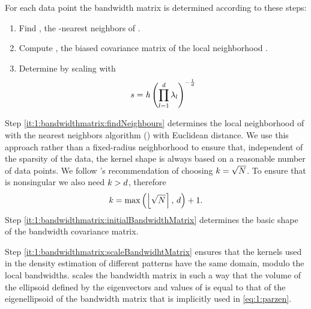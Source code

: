	For each data point \varPattern the bandwidth matrix is determined according to these steps:
		\begin{enumerate}[labelindent=0ex]
			\item \label{it:1:bandwidthmatrix:findNeighbours}
				Find \varNeighborhood{\varPattern}, the \KNNK-nearest neighbors of \varPattern.
			\item \label{it:1:bandwidthmatrix:initialBandwidthMatrix}
				Compute \varCovarianceMatrix, the biased covariance matrix of the local neighborhood \varNeighborhood{\varPattern}.
			\item \label{it:1:bandwidthmatrix:scaleBandwidhtMatrix}
				Determine \varBandwidthMatrix by scaling \varCovarianceMatrix with
				\begin{equation}\label{eq:method:scalingFactor}
					s = \mathit{h} \left( \displaystyle\prod_{l = 1}^{d} \lambda_{l} \right)^{-\frac{1}{d}}
				\end{equation}
		\end{enumerate}	
			Step \ref{it:1:bandwidthmatrix:findNeighbours} determines the local neighborhood of \varPattern with the \KNNK nearest neighbors algorithm (\KNN) with Euclidean distance. We use this approach rather than a fixed-radius neighborhood to ensure that, independent of the sparsity of the data, the kernel shape is always based on a reasonable number of data points. 
			We follow \citeauthor{silverman1986density}'s \cite{silverman1986density} recommendation of choosing $k = \sqrt{N}$. To ensure that \varCovarianceMatrix is nonsingular we also need $k > d$, therefore
			\begin{equation*}
				k = \max\left(\left\lfloor \sqrt{N} \right\rceil,\, d \right) + 1.	
			\end{equation*}
			Step \ref{it:1:bandwidthmatrix:initialBandwidthMatrix} determines the basic shape of the bandwidth covariance matrix. 

			Step \ref{it:1:bandwidthmatrix:scaleBandwidhtMatrix} ensures that the kernels used in the density estimation of different patterns have the same domain, modulo the local bandwidths.  scales the bandwidth matrix in such a way that the volume of the ellipsoid defined by the eigenvectors and values of \varBandwidthMatrix is equal to that of the eigenellipsoid of the bandwidth matrix that is implicitly used in \cref{eq:1:parzen}.